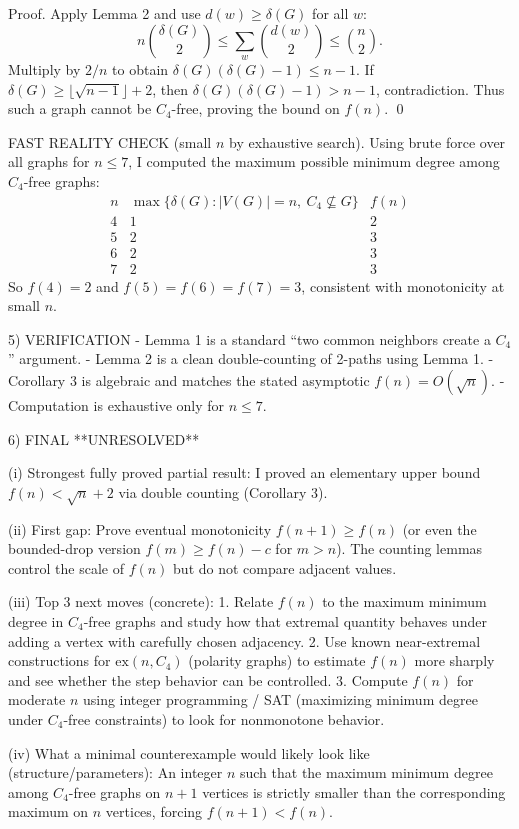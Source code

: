 Proof.
Apply Lemma 2 and use $d(w)\ge \delta(G)$ for all $w$:
\[n\binom{\delta(G)}{2} \le \sum_w \binom{d(w)}{2}\le \binom{n}{2}.\]
Multiply by $2/n$ to obtain $\delta(G)(\delta(G)-1)\le n-1$.
If $\delta(G)\ge \lfloor \sqrt{n-1}\rfloor+2$, then $\delta(G)(\delta(G)-1)> n-1$, contradiction.
Thus such a graph cannot be $C_4$-free, proving the bound on $f(n)$. \qed

FAST REALITY CHECK (small $n$ by exhaustive search).
Using brute force over all graphs for $n\le 7$, I computed the maximum possible minimum degree among $C_4$-free graphs:
\[
\begin{array}{c|c|c}
n & \max\{\delta(G): |V(G)|=n,\ C_4\nsubseteq G\} & f(n)\\\hline
4 & 1 & 2\\
5 & 2 & 3\\
6 & 2 & 3\\
7 & 2 & 3
\end{array}
\]
So $f(4)=2$ and $f(5)=f(6)=f(7)=3$, consistent with monotonicity at small $n$.

5) VERIFICATION
- Lemma 1 is a standard ``two common neighbors create a $C_4$'' argument.
- Lemma 2 is a clean double-counting of 2-paths using Lemma 1.
- Corollary 3 is algebraic and matches the stated asymptotic $f(n)=O(\sqrt n)$.
- Computation is exhaustive only for $n\le 7$.

6) FINAL
**UNRESOLVED**

(i) Strongest fully proved partial result:
I proved an elementary upper bound $f(n)<\sqrt n+2$ via double counting (Corollary 3).

(ii) First gap:
Prove eventual monotonicity $f(n+1)\ge f(n)$ (or even the bounded-drop version $f(m)\ge f(n)-c$ for $m>n$).
The counting lemmas control the scale of $f(n)$ but do not compare adjacent values.

(iii) Top 3 next moves (concrete):
1. Relate $f(n)$ to the maximum minimum degree in $C_4$-free graphs and study how that extremal quantity behaves under adding a vertex with carefully chosen adjacency.
2. Use known near-extremal constructions for $\mathrm{ex}(n,C_4)$ (polarity graphs) to estimate $f(n)$ more sharply and see whether the step behavior can be controlled.
3. Compute $f(n)$ for moderate $n$ using integer programming / SAT (maximizing minimum degree under $C_4$-free constraints) to look for nonmonotone behavior.

(iv) What a minimal counterexample would likely look like (structure/parameters):
An integer $n$ such that the maximum minimum degree among $C_4$-free graphs on $n+1$ vertices is strictly smaller than the corresponding maximum on $n$ vertices,
forcing $f(n+1)<f(n)$.



